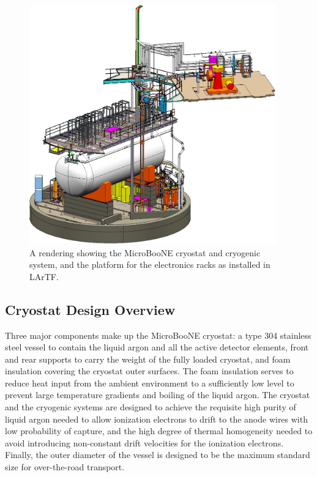 \begin{figure}
\centering 
\includegraphics[width=0.95\textwidth]{figures/FULL-ASSY-1.jpg}
\caption{A rendering showing the MicroBooNE cryostat and cryogenic system, and the platform for the electronics racks as installed in LArTF.}
\label{fig:cryogenics}
\end{figure}




\subsection{Cryostat Design Overview}

Three major components make up the MicroBooNE cryostat: a type 304 stainless steel vessel to contain the liquid argon and all the active detector elements, front and rear supports to carry the weight of the fully loaded cryostat, and foam insulation covering the cryostat outer surfaces.  The foam insulation serves to reduce heat input from the ambient environment to a sufficiently low level to prevent large temperature gradients and boiling of the liquid argon. The cryostat and the cryogenic systems are designed to achieve the requisite high purity of liquid argon needed to allow ionization electrons to drift to the anode wires with low probability of capture, and the high degree of thermal homogeneity needed to avoid introducing non-constant drift velocities for the ionization electrons. Finally, the outer diameter of the vessel is designed to be the maximum standard size for over-the-road transport.


